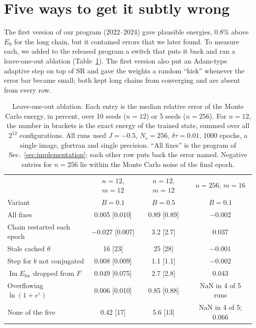 \documentclass[aps,prb,preprint,amsmath,amssymb,nofootinbib,longbibliography]{revtex4-2}
\newcommand{\Eloc}{E_{\mathrm{loc}}}
\newcommand{\dtau}{\delta\tau}
\renewcommand{\Im}{\operatorname{Im}}
\begin{document}
\section{Five ways to get it subtly wrong}
\label{sec:pitfalls}

The first version of our program (2022--2024) gave plausible energies, 0.8\% above $E_0$ for the long chain, but
it contained errors that we later found. To measure each, we added to the released program a switch that puts it
back and ran a leave-one-out ablation (Table~\ref{tab:ablation}). The first version also put an Adam-type adaptive
step on top of SR and gave the weights a random ``kick'' whenever the error bar became small; both kept long chains
from converging and are absent from every row.

\begin{table}[t]
\caption{Leave-one-out ablation. Each entry is the median relative error of the Monte Carlo energy, in percent, over
10 seeds ($n = 12$) or 5 seeds ($n = 256$). For $n = 12$, the number in brackets is the exact energy of the trained
state, summed over all $2^{12}$ configurations. All runs used $J = -0.5$, $N_s = 256$, $\dtau = 0.01$, 1000 epochs, a
single image, gfortran and single precision. ``All fixes'' is the program of Sec.~\ref{sec:implementation}; each
other row puts back the error named. Negative entries for $n = 256$ lie within the Monte Carlo noise of the final
epoch.}
\label{tab:ablation}
\begin{ruledtabular}
\begin{tabular}{lccc}
 & $n = 12$, $m = 12$ & $n = 12$, $m = 12$ & $n = 256$, $m = 16$ \\
Variant & $B = 0.1$ & $B = 0.5$ & $B = 0.1$ \\
\hline
All fixes & 0.005 [0.010] & 0.89 [0.89] & $-0.002$ \\
Chain restarted each epoch & $\mathbf{-0.027}$ [0.007] & 3.2 [2.7] & 0.037 \\
Stale cached $\theta$ & 16 [23]\footnotemark[1] & 25 [28] & $-0.001$ \\
Step for $b$ not conjugated & 0.008 [0.009] & 1.1 [1.1] & $-0.002$ \\
$\Im \Eloc$ dropped from $F$ & 0.049 [0.075] & 2.7 [2.8] & 0.043 \\
Overflowing $\ln(1+e^z)$ & 0.006 [0.010] & 0.85 [0.88] & NaN in 4 of 5 runs \\
None of the five & 0.42 [17] & 5.6 [13] & NaN in 4 of 5; 0.066 \\
\end{tabular}
\end{ruledtabular}
\end{table}
\end{document}
